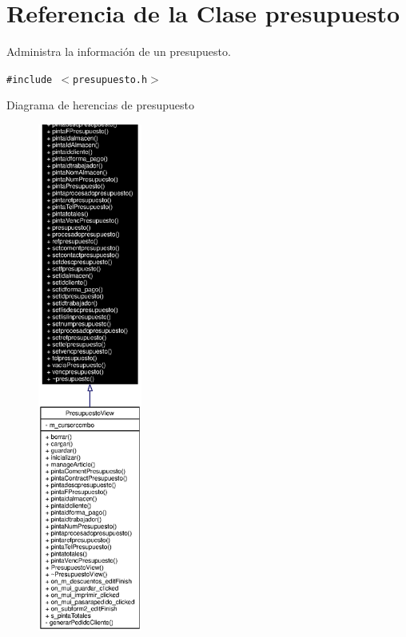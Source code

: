 \section{Referencia de la Clase presupuesto}
\label{classpresupuesto}
Administra la informaci\'{o}n de un presupuesto.  


{\tt \#include $<$presupuesto.h$>$}

Diagrama de herencias de presupuesto\begin{figure}[H]
\begin{center}
\leavevmode
\includegraphics[width=97pt]{classpresupuesto__inherit__graph}
\end{center}
\end{figure}
